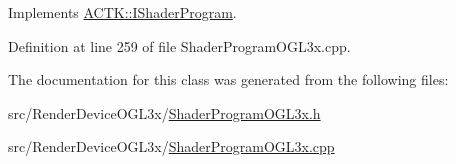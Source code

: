 Implements \hyperlink{class_a_c_t_k_1_1_i_shader_program_a9b2fdc87b554767e170e41fffb9819e1}{A\-C\-T\-K\-::\-I\-Shader\-Program}.



Definition at line 259 of file Shader\-Program\-O\-G\-L3x.\-cpp.



The documentation for this class was generated from the following files\-:\begin{DoxyCompactItemize}
\item 
src/\-Render\-Device\-O\-G\-L3x/\hyperlink{_shader_program_o_g_l3x_8h}{Shader\-Program\-O\-G\-L3x.\-h}\item 
src/\-Render\-Device\-O\-G\-L3x/\hyperlink{_shader_program_o_g_l3x_8cpp}{Shader\-Program\-O\-G\-L3x.\-cpp}\end{DoxyCompactItemize}
